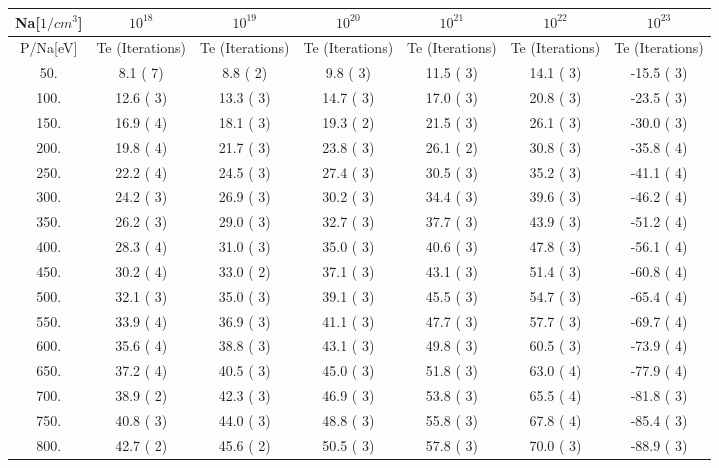 \begin{tabular}{|c||c|c|c|c|c|c|}
\hline
Na[$1/cm^3$] & $10^{18}$ & $10^{19}$ & $10^{20}$ & $10^{21}$ & $10^{22}$ & $10^{23}$\tabularnewline
\hline
P/Na[eV] & Te (Iterations) &  Te (Iterations) &  Te (Iterations) &  Te (Iterations) &  Te (Iterations) &  Te (Iterations) \tabularnewline
\hline
\hline
   50. &     8.1 (      7) &     8.8 (      2) &     9.8 (      3) &    11.5 (      3) &    14.1 (      3) &   -15.5 (      3)\tabularnewline
\hline
  100. &    12.6 (      3) &    13.3 (      3) &    14.7 (      3) &    17.0 (      3) &    20.8 (      3) &   -23.5 (      3)\tabularnewline
\hline
  150. &    16.9 (      4) &    18.1 (      3) &    19.3 (      2) &    21.5 (      3) &    26.1 (      3) &   -30.0 (      3)\tabularnewline
\hline
  200. &    19.8 (      4) &    21.7 (      3) &    23.8 (      3) &    26.1 (      2) &    30.8 (      3) &   -35.8 (      4)\tabularnewline
\hline
  250. &    22.2 (      4) &    24.5 (      3) &    27.4 (      3) &    30.5 (      3) &    35.2 (      3) &   -41.1 (      4)\tabularnewline
\hline
  300. &    24.2 (      3) &    26.9 (      3) &    30.2 (      3) &    34.4 (      3) &    39.6 (      3) &   -46.2 (      4)\tabularnewline
\hline
  350. &    26.2 (      3) &    29.0 (      3) &    32.7 (      3) &    37.7 (      3) &    43.9 (      3) &   -51.2 (      4)\tabularnewline
\hline
  400. &    28.3 (      4) &    31.0 (      3) &    35.0 (      3) &    40.6 (      3) &    47.8 (      3) &   -56.1 (      4)\tabularnewline
\hline
  450. &    30.2 (      4) &    33.0 (      2) &    37.1 (      3) &    43.1 (      3) &    51.4 (      3) &   -60.8 (      4)\tabularnewline
\hline
  500. &    32.1 (      3) &    35.0 (      3) &    39.1 (      3) &    45.5 (      3) &    54.7 (      3) &   -65.4 (      4)\tabularnewline
\hline
  550. &    33.9 (      4) &    36.9 (      3) &    41.1 (      3) &    47.7 (      3) &    57.7 (      3) &   -69.7 (      4)\tabularnewline
\hline
  600. &    35.6 (      4) &    38.8 (      3) &    43.1 (      3) &    49.8 (      3) &    60.5 (      3) &   -73.9 (      4)\tabularnewline
\hline
  650. &    37.2 (      4) &    40.5 (      3) &    45.0 (      3) &    51.8 (      3) &    63.0 (      4) &   -77.9 (      4)\tabularnewline
\hline
  700. &    38.9 (      2) &    42.3 (      3) &    46.9 (      3) &    53.8 (      3) &    65.5 (      4) &   -81.8 (      3)\tabularnewline
\hline
  750. &    40.8 (      3) &    44.0 (      3) &    48.8 (      3) &    55.8 (      3) &    67.8 (      4) &   -85.4 (      3)\tabularnewline
\hline
  800. &    42.7 (      2) &    45.6 (      2) &    50.5 (      3) &    57.8 (      3) &    70.0 (      3) &   -88.9 (      3)\tabularnewline

\end{tabular}
